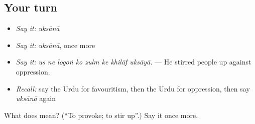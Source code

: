 \subsection*{Your turn}
\begin{itemize}
\raggedright
  \item \emph{Say it:} \emph{uksānā}
  \item \emph{Say it:} \emph{uksānā}, once more
  \item \emph{Say it:} \emph{us ne logoṅ ko zulm ke khilāf uksāyā.} — He stirred people up against oppression.
  \item \emph{Recall:} say the Urdu for favouritism, then the Urdu for oppression, then say \emph{uksānā} again
\end{itemize}

\begin{tcolorbox}[breakable,colback=teal!4,colframe=teal!35!black,title={Before you move on}]
What does  mean? (\textquotedblleft{}To provoke; to stir up\textquotedblright{}.) Say it once more.
\end{tcolorbox}
